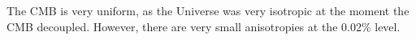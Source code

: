 The CMB is very uniform, as the Universe was very isotropic at the moment the CMB decoupled. 
However, there are very small anisotropies at the 0.02\% level.





